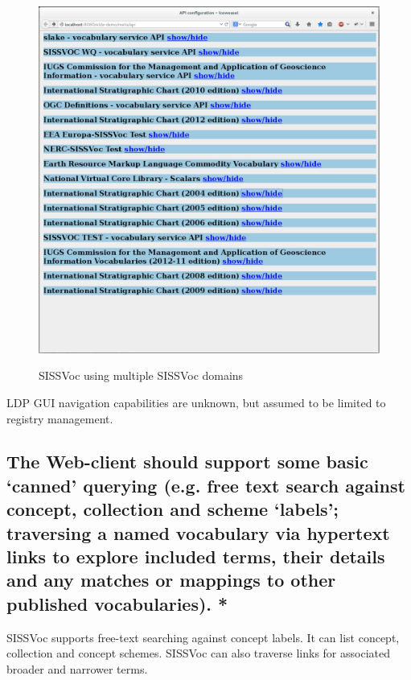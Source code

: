 \documentclass[10pt,a4paper]{article}
\begin{document}
\begin{flushleft}
{%
\begin{figure}[H]
\centering
\caption{SISSVoc using multiple SISSVoc domains}
\includegraphics[width=12cm]{multipleendpoints}  
\label{fig:test}
\end{figure}

LDP GUI navigation capabilities are unknown, but assumed to be limited to 
registry management.
}
%
%
\subsection{ The Web-client should support some basic ‘canned’ querying (e.g.
free text search against concept, collection and scheme ‘labels’; traversing a
named vocabulary via hypertext links to explore included terms, their details
and any matches or mappings to other published vocabularies). * }
%
SISSVoc supports free-text searching against concept labels. It can list
concept, collection and concept schemes. SISSVoc can also traverse links 
for associated broader and narrower terms. 


\end{flushleft}
\end{document}
